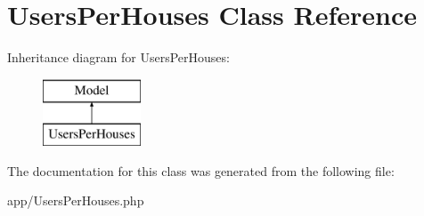 \hypertarget{class_app_1_1_users_per_houses}{}\section{Users\+Per\+Houses Class Reference}
\label{class_app_1_1_users_per_houses}
Inheritance diagram for Users\+Per\+Houses\+:\begin{figure}[H]
\begin{center}
\leavevmode
\includegraphics[height=2.000000cm]{class_app_1_1_users_per_houses}
\end{center}
\end{figure}


The documentation for this class was generated from the following file\+:\begin{DoxyCompactItemize}
\item 
app/Users\+Per\+Houses.\+php\end{DoxyCompactItemize}
